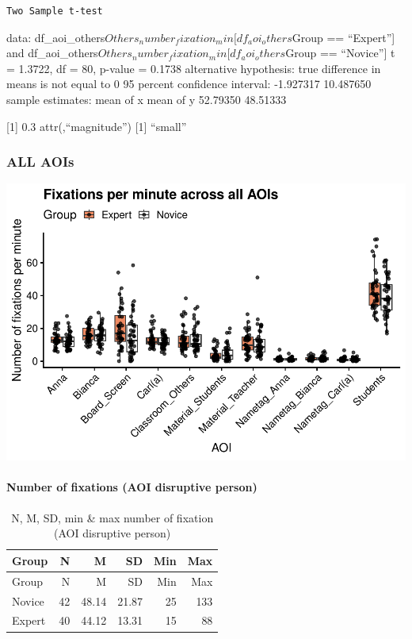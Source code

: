 \documentclass[
]{article}
\begin{document}
\begin{verbatim}
Two Sample t-test
\end{verbatim}

data: df\_aoi\_others\(Others_number_fixation_min[df_aoi_others\)Group
== ``Expert''{]} and
df\_aoi\_others\(Others_number_fixation_min[df_aoi_others\)Group ==
``Novice''{]} t = 1.3722, df = 80, p-value = 0.1738 alternative
hypothesis: true difference in means is not equal to 0 95 percent
confidence interval: -1.927317 10.487650 sample estimates: mean of x
mean of y 52.79350 48.51333

{[}1{]} 0.3 attr(,``magnitude'') {[}1{]} ``small''

\subsubsection{ALL AOIs}\label{all-aois}

\includegraphics{expertise_2024_09_26_no_outlierdetection_MK_files/figure-latex/nof_all_aois-1.pdf}

\paragraph{Number of fixations (AOI disruptive
person)}\label{number-of-fixations-aoi-disruptive-person}

\begin{longtable}[]{@{}lrrrrr@{}}
\caption{N, M, SD, min \& max number of fixation (AOI disruptive
person)}\tabularnewline
\toprule\noalign{}
Group & N & M & SD & Min & Max \\
\midrule\noalign{}
\endfirsthead
\toprule\noalign{}
Group & N & M & SD & Min & Max \\
\midrule\noalign{}
\endhead
\bottomrule\noalign{}
\endlastfoot
Novice & 42 & 48.14 & 21.87 & 25 & 133 \\
Expert & 40 & 44.12 & 13.31 & 15 & 88 \\
\end{longtable}
\end{document}
